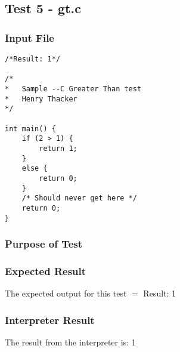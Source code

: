 \subsection{Test 5 - gt.c}
\subsubsection{Input File}
\begin{lstlisting}[showstringspaces=false,breaklines=true,backgroundcolor=\color{light-gray}, captionpos=b]
/*Result: 1*/

/*
*	Sample --C Greater Than test
*	Henry Thacker
*/

int main() {
	if (2 > 1) {
		return 1;
	}
	else {
		return 0;
	}
	/* Should never get here */
	return 0;
}
\end{lstlisting}\subsubsection{Purpose of Test}

\subsubsection{Expected Result}
The expected output for this test $=$ Result: 1
\subsubsection{Interpreter Result}
The result from the interpreter is: 1
